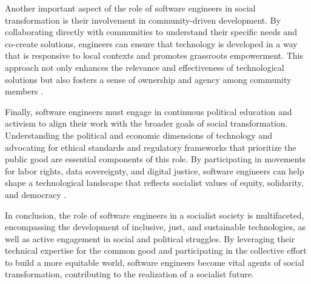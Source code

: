\begin{refsection}
Another important aspect of the role of software engineers in social transformation is their involvement in community-driven development. By collaborating directly with communities to understand their specific needs and co-create solutions, engineers can ensure that technology is developed in a way that is responsive to local contexts and promotes grassroots empowerment. This approach not only enhances the relevance and effectiveness of technological solutions but also fosters a sense of ownership and agency among community members \cite[pp.~110-115]{milanSocialMovements2015}.

Finally, software engineers must engage in continuous political education and activism to align their work with the broader goals of social transformation. Understanding the political and economic dimensions of technology and advocating for ethical standards and regulatory frameworks that prioritize the public good are essential components of this role. By participating in movements for labor rights, data sovereignty, and digital justice, software engineers can help shape a technological landscape that reflects socialist values of equity, solidarity, and democracy \cite[pp.~204-208]{morozovSocialChange2020}.

In conclusion, the role of software engineers in a socialist society is multifaceted, encompassing the development of inclusive, just, and sustainable technologies, as well as active engagement in social and political struggles. By leveraging their technical expertise for the common good and participating in the collective effort to build a more equitable world, software engineers become vital agents of social transformation, contributing to the realization of a socialist future.

\printbibliography[heading=subbibliography]
\end{refsection}